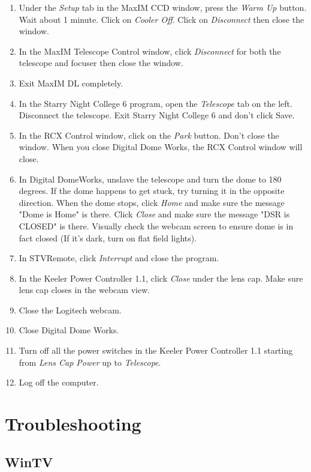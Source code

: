 \documentclass[11pt]{report}
\begin{document}
\begin{enumerate}
\item Under the \emph{Setup} tab in the MaxIM CCD window, press the \emph{Warm Up} button. Wait about 1 minute. Click on \emph{Cooler Off}. Click on \emph{Disconnect} then close the window.
\item In the MaxIM Telescope Control window, click \emph{Disconnect} for both the telescope and focuser then close the window.
\item Exit MaxIM DL completely.
\item In the Starry Night College 6 program, open the \emph{Telescope} tab on the left. Disconnect the telescope. Exit Starry Night College 6 and don't click Save.
\item In the RCX Control window, click on the \emph{Park} button. Don't close the window. When you close Digital Dome Works, the RCX Control window will close.
\item In Digital DomeWorks, unslave the telescope and turn the dome to 180 degrees. If the dome happens to get stuck, try turning it in the opposite direction. When the dome stops, click \emph{Home} and make sure the message "Dome is Home" is there. Click \emph{Close} and make sure the message "DSR is CLOSED" is there. Visually check the webcam screen to ensure dome is in fact closed (If it's dark, turn on flat field lights).
\item In STVRemote, click \emph{Interrupt} and close the program.
\item In the Keeler Power Controller 1.1, click \emph{Close} under the lens cap. Make sure lens cap closes in the webcam view.
\item Close the Logitech webcam.
\item Close Digital Dome Works.
\item Turn off all the power switches in the Keeler Power Controller 1.1 starting from \emph{Lens Cap Power} up to \emph{Telescope}.
\item Log off the computer.
\end{enumerate}

\chapter{Troubleshooting}

\section{WinTV}
\end{document}
